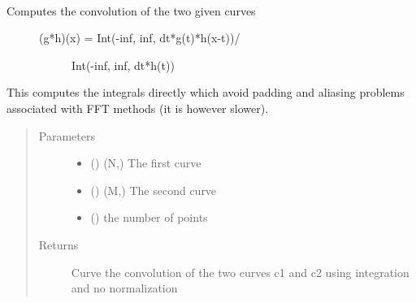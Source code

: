 \documentclass[letterpaper,10pt,english]{sphinxmanual}
\begin{document}
\begin{fulllineitems}
\label{\detokenize{pydv:pydvpy.convolvec}}~\begin{description}
\item[{Computes the convolution of the two given curves}] \leavevmode\begin{description}
\item[{(g*h)(x) = Int(-inf, inf, dt*g(t)*h(x-t))/}] \leavevmode
Int(-inf, inf, dt*h(t))

\end{description}

\end{description}

This computes the integrals directly which avoid padding and aliasing
problems associated with FFT methods (it is however slower).
\begin{quote}\begin{description}
\item[{Parameters}] \leavevmode\begin{itemize}
\item {} 
 ({\hyperref[\detokenize{pydv:curve.Curve}]{}}) \textendash{} (N,) The first curve

\item {} 
 ({\hyperref[\detokenize{pydv:curve.Curve}]{}}) \textendash{} (M,) The second curve

\item {} 
 () \textendash{} the number of points

\end{itemize}

\item[{Returns}] \leavevmode
Curve \textendash{} the convolution of the two curves c1 and c2 using integration and no normalization

\end{description}\end{quote}

\end{fulllineitems}

\end{document}
